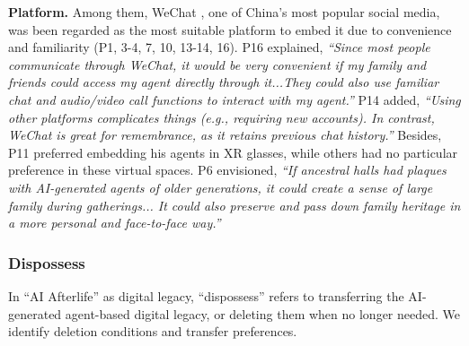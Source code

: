\textbf{Platform.}
 Among them, WeChat \cite{WeChat2024}, one of China's most popular social media, was been regarded as the most suitable platform to embed it due to convenience and familiarity (P1, 3-4, 7, 10, 13-14, 16). P16 explained, \textit{``Since most people communicate through WeChat, it would be very convenient if my family and friends could access my agent directly through it...They could also use familiar chat and audio/video call functions to interact with my agent.''} P14 added, \textit{``Using other platforms complicates things (e.g., requiring new accounts). In contrast, WeChat is great for remembrance, as it retains previous chat history.''} 
Besides, P11 preferred embedding his agents in XR glasses, while others had no particular preference in these virtual spaces.
P6 envisioned, \textit{``If ancestral halls had plaques with AI-generated agents of older generations, it could create a sense of large family during gatherings... It could also preserve and pass down family heritage in a more personal and face-to-face way.''}

\subsubsection{Dispossess}

In ``AI Afterlife'' as digital legacy, ``dispossess'' refers to transferring the AI-generated agent-based digital legacy, or deleting them when no longer needed. We identify deletion conditions and transfer preferences.

